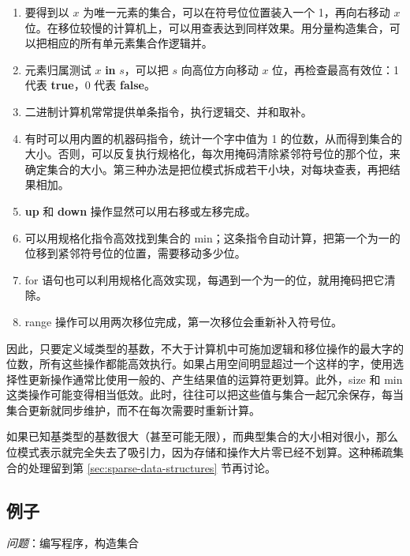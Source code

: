 \documentclass[twoside,11pt,fontset=none]{ctexbook}
\begin{document}
\begin{enumerate}[wide, nosep, label=(\arabic*)]
	\item 要得到以 $x$ 为唯一元素的集合，可以在符号位位置装入一个 1，再向右移动 $x$ 位。在移位较慢的计算机上，可以用查表达到同样效果。用分量构造集合，可以把相应的所有单元素集合作逻辑并。

	\item 元素归属测试 $x$ \textbf{in} $s$，可以把 $s$ 向高位方向移动 $x$ 位，再检查最高有效位：1 代表 \textbf{true}，0 代表 \textbf{false}。

	\item 二进制计算机常常提供单条指令，执行逻辑交、并和取补。

	\item 有时可以用内置的机器码指令，统计一个字中值为 1 的位数，从而得到集合的大小。否则，可以反复执行规格化，每次用掩码清除紧邻符号位的那个位，来确定集合的大小。第三种办法是把位模式拆成若干小块，对每块查表，再把结果相加。

	\item \textbf{up} 和 \textbf{down} 操作显然可以用右移或左移完成。

	\item 可以用规格化指令高效找到集合的 min；这条指令自动计算，把第一个为一的位移到紧邻符号位的位置，需要移动多少位。

	\item for 语句也可以利用规格化高效实现，每遇到一个为一的位，就用掩码把它清除。

	\item range 操作可以用两次移位完成，第一次移位会重新补入符号位。	
\end{enumerate}

因此，只要定义域类型的基数，不大于计算机中可施加逻辑和移位操作的最大字的位数，所有这些操作都能高效执行。如果占用空间明显超过一个这样的字，使用选择性更新操作通常比使用一般的、产生结果值的运算符更划算。此外，size 和 min 这类操作可能变得相当低效。此时，往往可以把这些值与集合一起冗余保存，每当集合更新就同步维护，而不在每次需要时重新计算。

如果已知基类型的基数很大（甚至可能无限），而典型集合的大小相对很小，那么位模式表示就完全失去了吸引力，因为存储和操作大片零已经不划算。这种稀疏集合的处理留到第 \ref{sec:sparse-data-structures} 节再讨论。

\subsection{例子}

\noindent
\textit{问题}：编写程序，构造集合
\end{document}
